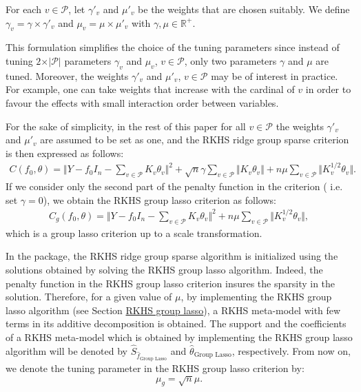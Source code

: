 For each $v\in\mathcal{P}$, let $\gamma'_v$ and $\mu'_v$ be the weights that are chosen suitably. We define $\gamma_v=\gamma\times\gamma'_v$ and $\mu_v=\mu\times\mu'_v$ with $\gamma,\mu\in\mathbb{R}^+$.
\begin{rem} This formulation simplifies the choice of the tuning parameters since instead of tuning $2\times\vert\mathcal{P}\vert$ parameters $\gamma_v$ and $\mu_v$, $v\in\mathcal{P}$, only two parameters $\gamma$ and $\mu$ are tuned. Moreover, the weights $\gamma'_v$ and $\mu'_v$, $v\in\mathcal{P}$ may be of interest in practice. For example, one can take weights that increase with the cardinal of $v$ in order to favour the effects with small interaction order between variables.
\end{rem}
For the sake of simplicity, in the rest of this paper for all $v\in\mathcal{P}$ the weights $\gamma'_v$ and $\mu'_v$ are assumed to be set as one, and the RKHS ridge group sparse criterion is then expressed as follows:
\begin{align}
\label{parametric}
C(f_0,\theta)=\Vert Y-f_0 I_n-\sum_{v\in\mathcal{P}}K_v\theta_v\Vert^2+\sqrt{n}\gamma\sum_{v\in\mathcal{P}}\Vert K_v\theta_v\Vert+n\mu\sum_{v\in\mathcal{P}}\Vert K_v^{1/2}\theta_v\Vert.
\end{align}
If we consider only the second part of the penalty function in the criterion  ( i.e. set $\gamma=0$), we obtain the RKHS group lasso criterion as follows:
\begin{align}
\label{Lasso}
C_g(f_0,\theta)=\Vert Y-f_0I_n-\sum_{v\in\mathcal{P}}K_v\theta_v\Vert^2+n\mu\sum_{v\in\mathcal{P}}\Vert K_v^{1/2}\theta_v\Vert,
\end{align}
which is a group lasso criterion \citep{doi:10.1111/j.1467-9868.2005.00532.x} up to a scale transformation.

In the  package, the RKHS ridge group sparse algorithm is initialized using the solutions obtained by solving the RKHS group lasso algorithm.
Indeed, the penalty function in the RKHS group lasso criterion  insures the sparsity in the solution. Therefore, for a given value of $\mu$, by implementing the RKHS group lasso algorithm (see Section \hyperref[subsec:optimGL]{RKHS group lasso}), a RKHS meta-model with few terms in its additive decomposition is obtained. The support and the coefficients of a RKHS meta-model which is obtained by implementing the RKHS group lasso algorithm will be denoted by $\widehat{S}_{\widehat{f}_{\text{Group Lasso}}}$ and $\widehat{\theta}_{\text{Group Lasso}}$, respectively.
From now on, we denote the tuning parameter in the RKHS group lasso criterion by:
\begin{equation}
\label{tungrp}
\mu_g=\sqrt{n}\mu.
\end{equation}
